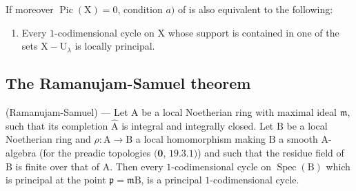 \begin{remark}[21.13.16]
If moreover $\operatorname{Pic}(\mathrm{X})=0$, condition $a)$ of  is also equivalent to the following:
\begin{enumerate}
  \item[c)] Every $1$-codimensional cycle on $\mathrm{X}$ whose support is contained in one of the sets $\mathrm{X}-\mathrm{U}_\lambda$ is locally principal.
\end{enumerate}
\end{remark}

\subsection{The Ramanujam-Samuel theorem}
\label{subsection:IV.21.14}

\begin{theorem}[21.14.1]
\label{IV.21.14.1}
\textup{(Ramanujam-Samuel)} ---
Let $\mathrm{A}$ be a local Noetherian ring with maximal ideal $\mathfrak{m}$, such that its completion $\widehat{\mathrm{A}}$ is integral and integrally closed.
Let $\mathrm{B}$ be a local Noetherian ring and $\rho:\mathrm{A}\to\mathrm{B}$ a local homomorphism making $\mathrm{B}$ a smooth A-algebra (for the preadic topologies $(\mathbf{0}$, $19.3.1)$) and such that the residue field of $\mathrm{B}$ is finite over that of $\mathrm{A}$.
Then every $1$-codimensional cycle on $\operatorname{Spec}(\mathrm{B})$ which is principal at the point $\mathfrak{p}=\mathfrak{m}\mathrm{B}$, is a principal $1$-codimensional cycle.
\end{theorem}

